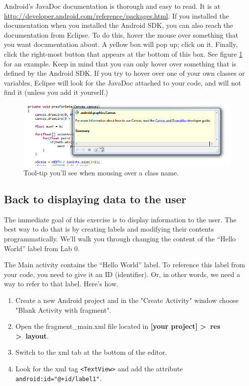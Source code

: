 \documentclass[10pt]{article}
\begin{document}
Android's JavaDoc documentation is thorough and easy to read. It is at \url{http://developer.android.com/reference/packages.html}. If you installed the documentation when you installed the Android SDK, you can also reach the documentation from Eclipse. To do this, hover the mouse over something that you want documentation about. A yellow box will pop up; click on it. Finally, click the right-most button that appears at the bottom of this box. See figure \ref{fig:javadoc-tooltip} for an example. Keep in mind that you can only hover over something that is defined by the Android SDK. If you try to hover over one of your own classes or variables, Eclipse will look for the JavaDoc attached to your code, and will not find it (unless you add it yourself.)

\begin{figure}[ht]
\includegraphics[width=\textwidth]{Javadoc-tooltip.png}
\caption{\label{fig:javadoc-tooltip}Tool-tip you'll see when mousing over a class name.}
\end{figure}

\subsection{Back to displaying data to the user} The immediate goal of this exercise is to display information to the user. The best way to do that is by creating labels and modifying their contents programmatically. We'll walk you through changing the content of the ``Hello World'' label from Lab 0.

The Main activity contains the ``Hello World'' label. To reference this label from your code, you need to give it an ID (identifier). Or, in other words, we need a way to refer to that label. Here's how.
\begin{enumerate}
\item Create a new Android project and in the "Create Activity" window choose "Blank Activity with fragment".
\item Open the fragment\_main.xml file located in \textbf{[your project] \textgreater~res \textgreater~layout}. 
\item Switch to the xml tab at the bottom of the editor.
\item Look for the xml tag \verb+<TextView>+ and add the attribute \verb-android:id="@+id/label1"-.
\end{enumerate}
\end{document}
